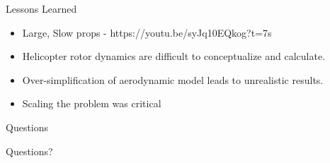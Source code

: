 \documentclass{beamer}
\begin{document}
\begin{frame}{Lessons Learned}
	\begin{itemize}
		\item{Large, Slow props - https://youtu.be/syJq10EQkog?t=7s}
		\item{Helicopter rotor dynamics are difficult to conceptualize and calculate.}
		\item{Over-simplification of aerodynamic model leads to unrealistic results.}
		\item{Scaling the problem was critical}	
	\end{itemize}
\end{frame}

\begin{frame}{Questions}
	
		\begin{center}
			Questions?
		\end{center}
	
\end{frame}
\end{document}
